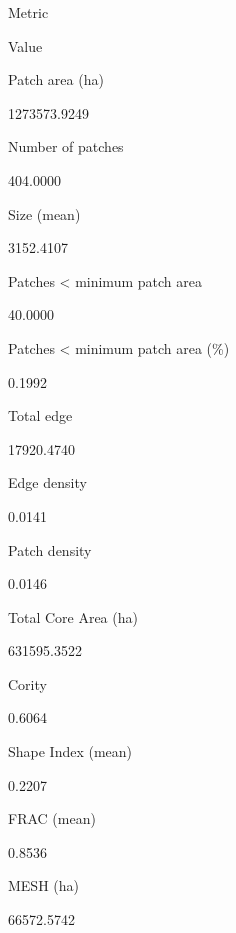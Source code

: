 \documentclass[
]{book}
\begin{document}
Metric

Value

Patch area (ha)

1273573.9249

Number of patches

404.0000

Size (mean)

3152.4107

Patches \textless{} minimum patch area

40.0000

Patches \textless{} minimum patch area (\%)

0.1992

Total edge

17920.4740

Edge density

0.0141

Patch density

0.0146

Total Core Area (ha)

631595.3522

Cority

0.6064

Shape Index (mean)

0.2207

FRAC (mean)

0.8536

MESH (ha)

66572.5742
\end{document}
